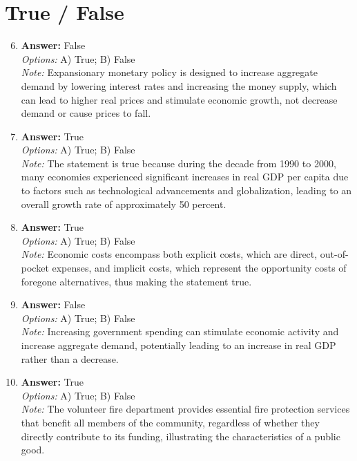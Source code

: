 \documentclass[12pt]{article}
\begin{document}
\section*{True / False}
\begin{enumerate}[label=\arabic*.]
\setcounter{enumi}{5}
\item \textbf{Answer:} False
\\ \textit{Options:} A) True; B) False
\\ \textit{Note:} Expansionary monetary policy is designed to increase aggregate demand by lowering interest rates and increasing the money supply, which can lead to higher real prices and stimulate economic growth, not decrease demand or cause prices to fall.
\item \textbf{Answer:} True
\\ \textit{Options:} A) True; B) False
\\ \textit{Note:} The statement is true because during the decade from 1990 to 2000, many economies experienced significant increases in real GDP per capita due to factors such as technological advancements and globalization, leading to an overall growth rate of approximately 50 percent.
\item \textbf{Answer:} True
\\ \textit{Options:} A) True; B) False
\\ \textit{Note:} Economic costs encompass both explicit costs, which are direct, out-of-pocket expenses, and implicit costs, which represent the opportunity costs of foregone alternatives, thus making the statement true.
\item \textbf{Answer:} False
\\ \textit{Options:} A) True; B) False
\\ \textit{Note:} Increasing government spending can stimulate economic activity and increase aggregate demand, potentially leading to an increase in real GDP rather than a decrease.
\item \textbf{Answer:} True
\\ \textit{Options:} A) True; B) False
\\ \textit{Note:} The volunteer fire department provides essential fire protection services that benefit all members of the community, regardless of whether they directly contribute to its funding, illustrating the characteristics of a public good.
\end{enumerate}
\end{document}

